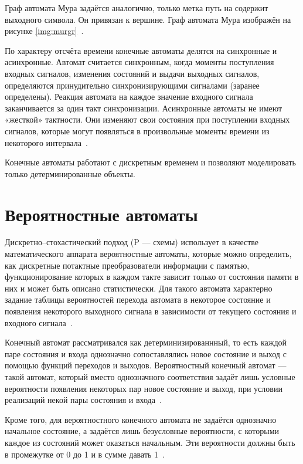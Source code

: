 \FloatBarrier

Граф автомата Мура задаётся аналогично, только метка путь на содержит выходного символа. Он привязан к вершине. Граф автомата Мура изображён на рисунке \ref{img:murgr}~\cite{ak_types}.

\FloatBarrier

По характеру отсчёта времени конечные автоматы делятся на синхронные и асинхронные. Автомат считается синхронным, когда моменты поступления входных сигналов, изменения состояний и выдачи выходных сигналов, определяются принудительно синхронизирующими сигналами (заранее определены). Реакция автомата на каждое значение входного сигнала заканчивается за один такт синхронизации. Асинхронные автоматы не имеют «жесткой» тактности. Они изменяют свои состояния при поступлении входных сигналов, которые могут появляться в произвольные моменты времени из некоторого интервала~\cite{ak_det}.

Конечные автоматы работают с дискретным временем и позволяют моделировать только детерминированные объекты. 

\section{Вероятностные автоматы}

Дискретно--стохастический подход (P --- схемы) использует в качестве математического аппарата вероятностные автоматы, которые можно определить, как дискретные потактные преобразователи информации с памятью, функционирование которых в каждом такте зависит только от состояния памяти в них и может быть описано статистически. Для такого автомата характерно задание таблицы вероятностей перехода автомата в некоторое состояние и появления некоторого выходного сигнала в зависимости от текущего состояния и входного сигнала~\cite{sheme_types}.

Конечный автомат рассматривался как детерминизированнный, то есть каждой паре состояния и входа однозначно сопоставлялись новое состояние и выход с помощью функций переходов и выходов. Вероятностный конечный автомат --- такой автомат, который вместо однозначного соответствия задаёт лишь условные вероятности появления некоторых пар новое состояние и выход, при условии реализаций некой пары состояния и входа~\cite{va}.

Кроме того, для вероятностного конечного автомата не задаётся однозначно начальное состояние, а задаётся лишь безусловные вероятности, с которыми каждое из состояний может оказаться начальным. Эти вероятности должны быть в промежутке от 0 до 1 и в сумме давать 1~\cite{va}. 

